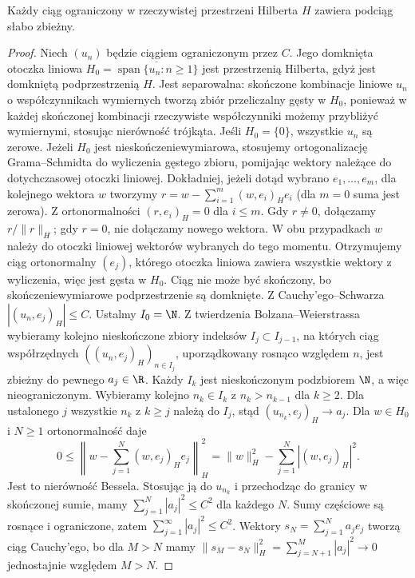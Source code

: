 \begin{lemat}
\label{lem:pde11-weakcompact}
Każdy ciąg ograniczony w rzeczywistej przestrzeni Hilberta
$H$ zawiera podciąg słabo zbieżny.
\end{lemat}
\begin{proof}
Niech $(u_n)$ będzie ciągiem ograniczonym przez $C$.
Jego domknięta otoczka liniowa
$H_0=\overline{\operatorname{span}\{u_n:n\ge1\}}$
jest przestrzenią Hilberta, gdyż jest domkniętą
podprzestrzenią $H$. Jest separowalna: skończone
kombinacje liniowe $u_n$ o współczynnikach wymiernych
tworzą zbiór przeliczalny gęsty w $H_0$, ponieważ
w każdej skończonej kombinacji rzeczywiste współczynniki
możemy przybliżyć wymiernymi, stosując nierówność trójkąta.
Jeśli $H_0=\{0\}$, wszystkie $u_n$ są zerowe.
Jeżeli $H_0$ jest nieskończeniewymiarowa, stosujemy
ortogonalizację Grama--Schmidta do wyliczenia gęstego
zbioru, pomijając wektory należące do dotychczasowej
otoczki liniowej. Dokładniej, jeżeli dotąd wybrano
$e_1,\ldots,e_m$, dla kolejnego wektora $w$ tworzymy
$r=w-\sum_{i=1}^m(w,e_i)_H e_i$ (dla $m=0$ suma
jest zerowa). Z ortonormalności $(r,e_i)_H=0$
dla $i\le m$. Gdy $r\ne0$, dołączamy $r/\|r\|_H$;
gdy $r=0$, nie dołączamy nowego wektora.
W obu przypadkach $w$ należy do otoczki liniowej
wektorów wybranych do tego momentu.
Otrzymujemy ciąg ortonormalny $(e_j)$, którego
otoczka liniowa zawiera wszystkie wektory
z wyliczenia, więc jest gęsta w $H_0$. Ciąg nie może
być skończony, bo skończeniewymiarowe podprzestrzenie
są domknięte.
Z Cauchy'ego--Schwarza $|(u_n,e_j)_H|\le C$.
Ustalmy $I_0=\N$. Z twierdzenia Bolzana--Weierstrassa
wybieramy kolejno nieskończone zbiory indeksów
$I_j\subset I_{j-1}$, na których ciąg współrzędnych
$((u_n,e_j)_H)_{n\in I_j}$, uporządkowany rosnąco
względem $n$, jest zbieżny do pewnego $a_j\in\R$.
Każdy $I_k$ jest nieskończonym podzbiorem $\N$,
a więc nieograniczonym. Wybieramy kolejno
$n_k\in I_k$ z $n_k>n_{k-1}$ dla $k\ge2$.
Dla ustalonego $j$ wszystkie $n_k$ z $k\ge j$
należą do $I_j$, stąd $(u_{n_k},e_j)_H\to a_j$.
Dla $w\in H_0$ i $N\ge1$ ortonormalność daje
\[
 0\le\left\|w-\sum_{j=1}^N(w,e_j)_H e_j\right\|_H^2
 =\|w\|_H^2-\sum_{j=1}^N|(w,e_j)_H|^2.
\]
Jest to nierówność Bessela. Stosując ją do $u_{n_k}$
i przechodząc do granicy w skończonej sumie, mamy
$\sum_{j=1}^N|a_j|^2\le C^2$ dla każdego $N$.
Sumy częściowe są rosnące i ograniczone, zatem
$\sum_{j=1}^\infty|a_j|^2\le C^2$.
Wektory $s_N=\sum_{j=1}^N a_je_j$ tworzą ciąg Cauchy'ego,
bo dla $M>N$ mamy
$\|s_M-s_N\|_H^2=\sum_{j=N+1}^M|a_j|^2\to0$
jednostajnie względem $M>N$.

\end{proof}
